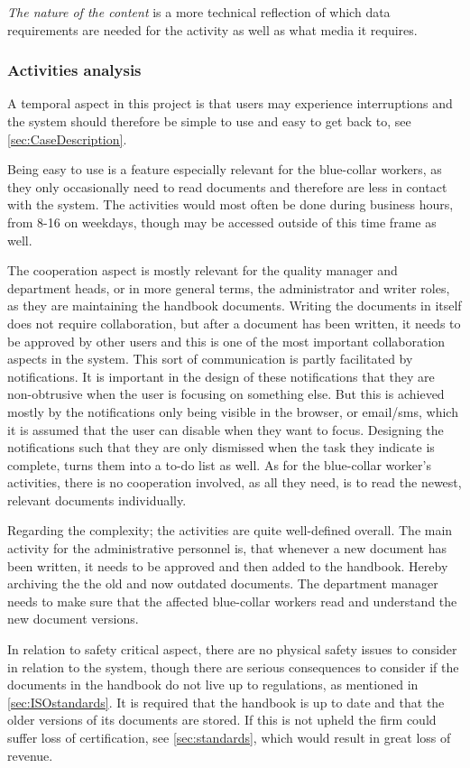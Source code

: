 \textit{The nature of the content} is a more technical reflection of which data requirements are needed for the activity as well as what media it requires.

\subsubsection*{Activities analysis}
A temporal aspect in this project is that users may experience interruptions and the system should therefore be simple to use and easy to get back to, see \cref{sec:CaseDescription}.

Being easy to use is a feature especially relevant for the blue-collar workers, as they only occasionally need to read documents and therefore are less in contact with the system.
The activities would most often be done during business hours, from 8-16 on weekdays, though may be accessed outside of this time frame as well.

The cooperation aspect is mostly relevant for the  quality manager and department heads, or in more general terms, the administrator and writer roles, as they are maintaining the handbook documents.
Writing the documents in itself does not require collaboration, but after a document has been written, it needs to be approved by other users and this is one of the most important collaboration aspects in the system.
This sort of communication is partly facilitated by notifications. 
It is important in the design of these notifications that they are non-obtrusive when the user is focusing on something else. 
But this is achieved mostly by the notifications only being visible in the browser, or email/sms, which it is assumed that the user can disable when they want to focus. 
Designing the notifications such that they are only dismissed when the task they indicate is complete, turns them into a to-do list as well.
As for the blue-collar worker's activities, there is no cooperation involved, as all they need, is to read the newest, relevant documents individually.

Regarding the complexity; the activities are quite well-defined overall.
The main activity for the administrative personnel is, that whenever a new document has been written, it needs to be approved and then added to the handbook.
Hereby archiving the the old and now outdated documents.
The department manager needs to make sure that the affected blue-collar workers read and understand the new document versions.

In relation to safety critical aspect, there are no physical safety issues to consider in relation to the system, though there are serious consequences to consider if the documents in the handbook do not live up to regulations, as mentioned in \cref{sec:ISOstandards}.
It is required that the handbook is up to date and that the older versions of its documents are stored.
If this is not upheld the firm could suffer loss of certification, see \cref{sec:standards}, which would result in great loss of revenue.

